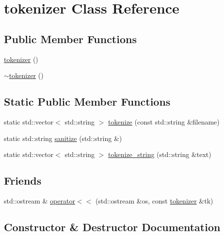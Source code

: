 \hypertarget{classtokenizer}{}\section{tokenizer Class Reference}
\label{classtokenizer}
\subsection*{Public Member Functions}
\begin{DoxyCompactItemize}
\item 
\hyperlink{classtokenizer_a17c0f75fb81172c979148ae72765c715}{tokenizer} ()
\item 
\hyperlink{classtokenizer_a458162a13637fc34d706f8743ffa8909}{$\sim$tokenizer} ()
\end{DoxyCompactItemize}
\subsection*{Static Public Member Functions}
\begin{DoxyCompactItemize}
\item 
static std\+::vector$<$ std\+::string $>$ \hyperlink{classtokenizer_aa1a768f007e710ff25d63a2cb1de83c3}{tokenize} (const std\+::string \&filename)
\item 
static std\+::string \hyperlink{classtokenizer_a5d553b843e67154be958b849fbf20b62}{sanitize} (std\+::string \&)
\item 
static std\+::vector$<$ std\+::string $>$ \hyperlink{classtokenizer_a9fbc8f511d0eeb0ca2f0333612c99a2a}{tokenize\+\_\+string} (std\+::string \&text)
\end{DoxyCompactItemize}
\subsection*{Friends}
\begin{DoxyCompactItemize}
\item 
std\+::ostream \& \hyperlink{classtokenizer_af8ab6eab63d97d86eb0e8a22eb94aafc}{operator$<$$<$} (std\+::ostream \&os, const \hyperlink{classtokenizer}{tokenizer} \&tk)
\end{DoxyCompactItemize}


\subsection{Constructor \& Destructor Documentation}
\mbox{\label{classtokenizer_a17c0f75fb81172c979148ae72765c715}} 
